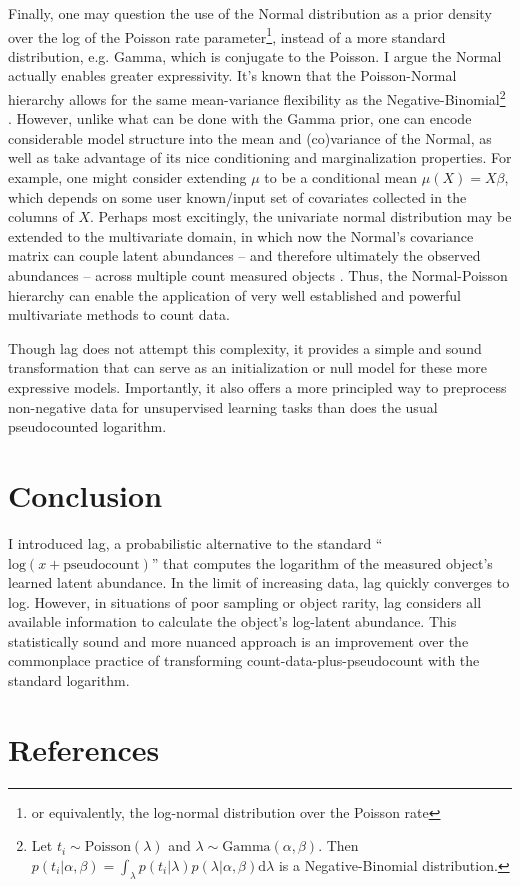 \documentclass[11pt]{article}
\begin{document}
Finally, one may question the use of the Normal distribution as a prior density over the log of the Poisson rate parameter\footnote[4]{or equivalently, the log-normal distribution over the Poisson rate}, instead of a more standard distribution, e.g. Gamma, which is conjugate to the Poisson. I argue the Normal actually enables greater expressivity. It's known that the Poisson-Normal hierarchy allows for the same mean-variance flexibility as the Negative-Binomial\footnote{Let $t_i \sim \textrm{Poisson}(\lambda)$ and $\lambda \sim \textrm{Gamma}(\alpha, \beta)$. Then $p(t_i|\alpha,\beta) = \int_\lambda p(t_i|\lambda)p(\lambda|\alpha,\beta)\textrm{d}\lambda$ is a Negative-Binomial distribution.} \cite{Aitchison1989}. However, unlike what can be done with the Gamma prior, one can encode considerable model structure into the mean and (co)variance of the Normal, as well as take advantage of its nice conditioning and marginalization properties.  For example, one might consider extending $\mu$ to be a conditional mean $\mu(X) = X\beta$, which depends on some user known/input set of covariates collected in the columns of $X$. Perhaps most excitingly, the univariate normal distribution may be extended to the multivariate domain, in which now the Normal's covariance matrix can couple latent abundances -- and therefore ultimately the observed abundances -- across multiple count measured objects \cite{Biswas2015, Aitchison1989}. Thus, the Normal-Poisson hierarchy can enable the application of very well established and powerful multivariate methods to count data.  

Though lag does not attempt this complexity, it provides a simple and sound transformation that can serve as an initialization or null model for these more expressive models. Importantly, it also offers a more principled way to preprocess non-negative data for unsupervised learning tasks than does the usual pseudocounted logarithm.

\section{Conclusion}

I introduced lag, a probabilistic alternative to the standard ``$\textrm{log}(x + \textrm{pseudocount})$'' that computes the logarithm of the measured object's learned latent abundance. In the limit of increasing data, lag quickly converges to log. However, in situations of poor sampling or object rarity,  lag considers all available information to calculate the object's log-latent abundance. This statistically sound and more nuanced approach is an improvement over the commonplace practice of transforming count-data-plus-pseudocount with the standard logarithm.

\section{References}

\end{document}
